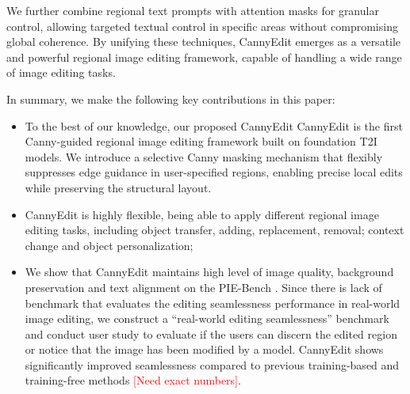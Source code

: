 \documentclass{article}
\begin{document}
We further combine regional text prompts with attention masks for granular control, allowing targeted textual control in specific areas without compromising global coherence. By unifying these techniques, CannyEdit emerges as a versatile and powerful regional image editing framework, capable of handling a wide range of image editing tasks.




In summary, we make the following key contributions in this paper:
\vspace{-1mm}
\begin{itemize}
    \item To the best of our knowledge,  our proposed CannyEdit CannyEdit is the first Canny-guided regional image editing framework built on foundation T2I models. We introduce a selective Canny masking mechanism that flexibly suppresses edge guidance in user-specified regions, enabling precise local edits while preserving the structural layout. %
    \item CannyEdit is highly flexible, being able to apply different regional image editing tasks, including object transfer, adding, replacement, removal; context change and object personalization;
    \item We show that CannyEdit maintains high level of image quality, background preservation and text alignment on the PIE-Bench \citep{brooks2023instructpix2pix}. Since there is lack of benchmark that evaluates the editing seamlessness performance in real-world image editing, we construct a ``real-world editing seamlessness'' benchmark and conduct user study to evaluate if the users can discern the edited region or notice that the image has been modified by a model. CannyEdit shows significantly improved seamlessness compared to previous training-based and training-free methods \textcolor{red}{[Need exact numbers]}. 
\end{itemize}



\end{document}
